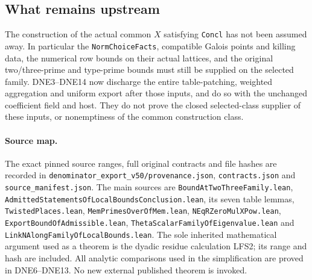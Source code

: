 
\subsection{What remains upstream}

The construction of the actual common $X$ satisfying
\texttt{Concl} has not been assumed away.  In particular the
\texttt{NormChoiceFacts}, compatible Galois points and killing data,
the numerical row bounds on their actual lattices, and the original
two/three-prime and type-prime bounds must still be supplied on
the selected family.  DNE3--DNE14 now discharge the entire
table-patching, weighted aggregation and uniform export after those
inputs, and do so with the unchanged coefficient field and host.
They do not prove the closed selected-class supplier of these inputs,
or nonemptiness of the common construction class.

\paragraph{Source map.}
The exact pinned source ranges, full original contracts and file hashes
are recorded in \texttt{denominator\_\allowbreak export\_\allowbreak v50/\allowbreak provenance.\allowbreak json},
\texttt{contracts.\allowbreak json} and \texttt{source\_\allowbreak manifest.\allowbreak json}.
The main sources are \texttt{Bound\allowbreak At\allowbreak Two\allowbreak Three\allowbreak Family.\allowbreak lean},
\texttt{Admitted\allowbreak Statements\allowbreak Of\allowbreak Local\allowbreak Bounds\allowbreak Conclusion.\allowbreak lean}, its seven
table lemmas, \texttt{Twisted\allowbreak Places.\allowbreak lean},
\texttt{Mem\allowbreak Primes\allowbreak Over\allowbreak Of\allowbreak Mem.\allowbreak lean}, \texttt{NEq\allowbreak RZero\allowbreak Mul\allowbreak XPow.\allowbreak lean},
\texttt{Export\allowbreak Bound\allowbreak Of\allowbreak Admissible.\allowbreak lean},
\texttt{Theta\allowbreak Scalar\allowbreak Family\allowbreak Of\allowbreak Eigenvalue.\allowbreak lean} and
\texttt{Link\allowbreak NAlong\allowbreak Family\allowbreak Of\allowbreak Local\allowbreak Bounds.\allowbreak lean}.
The sole inherited mathematical argument used as a theorem is the
dyadic residue calculation LFS2; its range and hash are included.
All analytic comparisons used in the simplification are proved in
DNE6--DNE13.  No new external published theorem is invoked.
